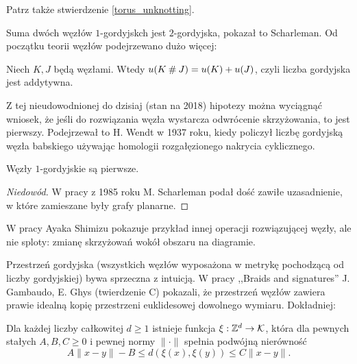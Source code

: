 Patrz także stwierdzenie \ref{torus_unknotting}.

Suma dwóch węzłów $1$-gordyjskch jest $2$-gordyjska, pokazał to Scharleman.
Od początku teorii węzłów podejrzewano dużo więcej:

\begin{conjecture}
    Niech $K, J$ będą węzłami.
    Wtedy $u(K \mathbin{\#} J) = u(K) + u(J)$, czyli liczba gordyjska jest addytywna.
\end{conjecture}

Z tej nieudowodnionej do dzisiaj (stan na 2018) hipotezy można wyciągnąć wniosek,
że jeśli do rozwiązania węzła wystarcza odwrócenie skrzyżowania, to jest pierwszy.
Podejrzewał to H. Wendt w 1937 roku,
kiedy policzył liczbę gordyjską węzła babskiego używając homologii rozgałęzionego nakrycia cyklicznego.

\begin{proposition}
    Węzły $1$-gordyjskie są pierwsze.
\end{proposition}

\begin{proof}[Niedowód]
    W pracy \cite{scharleman85} z 1985 roku M. Scharleman podał dość zawiłe uzasadnienie, w które zamieszane były grafy planarne.
\end{proof}

W pracy \cite{shimizu14} Ayaka Shimizu pokazuje przykład innej operacji rozwiązującej węzły, ale nie sploty:
zmianę skrzyżowań wokół obszaru na diagramie.

Przestrzeń gordyjska
(wszystkich węzłów wyposażona w metrykę pochodzącą od liczby gordyjskiej)
bywa sprzeczna z intuicją.
W pracy ,,Braids and signatures'' J. Gambaudo, E. Ghys (twierdzenie C) pokazali,
że przestrzeń węzłów zawiera prawie idealną kopię przestrzeni euklidesowej dowolnego wymiaru.
Dokładniej:

\begin{proposition}
    Dla każdej liczby całkowitej $d \ge 1$ istnieje funkcja $\xi: \mathbb Z^d \to \mathcal{K}$, która dla pewnych stałych $A, B, C \ge 0$ i pewnej normy $\|\cdot\|$ spełnia podwójną nierówność
    \[
        A\|x-y\|  - B \le d(\xi(x), \xi(y)) \le C\|x-y\|.
    \]
\end{proposition}

\begin{conjecture}
\end{conjecture}

